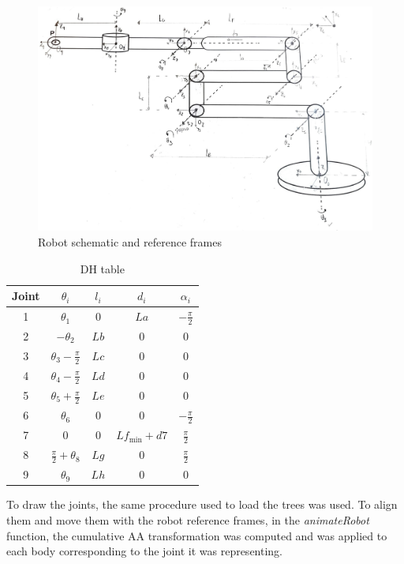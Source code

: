 \documentclass{report}
\begin{document}
\begin{figure}[h]
    \centering
    \includegraphics[scale=0.2]{resources/robot_draw.jpeg}
    \caption{\label{fig:r_draw}Robot schematic and reference frames}
\end{figure}

\begin{table}[H]
\centering
\begin{tabular}{|c|c|c|c|c|}
\hline
Joint & $\theta_i$ & $l_i$ & $d_i$ & $\alpha_i$ \\
\hline
1 & $\theta_1$ & 0 & $La$ & $-\frac{\pi}{2}$ \\
\hline
2 & $-\theta_2$ & $Lb$ & 0 & 0 \\
\hline
3 & $\theta_3 - \frac{\pi}{2}$ & $Lc$ & 0 & 0 \\
\hline
4 & $\theta_4 - \frac{\pi}{2}$ & $Ld$ & 0 & 0 \\
\hline
5 & $\theta_5 + \frac{\pi}{2}$ & $Le$ & 0 & 0 \\
\hline
6 & $\theta_6$ & 0 & 0 & $-\frac{\pi}{2}$ \\
\hline
7 & 0 & 0 & $Lf_{\text{min}} + d7$ & $\frac{\pi}{2}$ \\
\hline
8 & $\frac{\pi}{2} + \theta_8$ & $Lg$ & 0 & $\frac{\pi}{2}$ \\
\hline
9 & $\theta_9$ & $Lh$ & 0 & 0 \\
\hline
\end{tabular}
\caption{DH table}
\label{tab:dh}
\end{table}


To draw the joints, the same procedure used to load the trees was used. To align
them and move them with the robot reference frames, in the \textit{animateRobot}
function, the cumulative AA transformation was computed and was applied to each
body corresponding to the joint it was representing.
\end{document}
